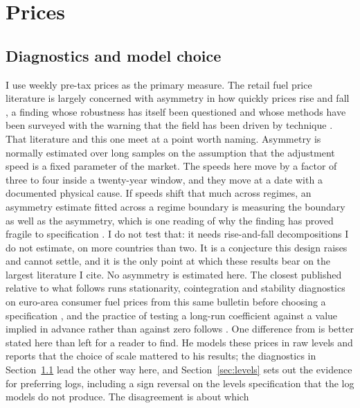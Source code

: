 \documentclass[11pt,a4paper]{article}
\begin{document}
\section{Prices}

\subsection{Diagnostics and model choice}
\label{sec:pricediag}

I use weekly pre-tax prices as the primary measure. The retail fuel price literature is largely
concerned with asymmetry in how quickly prices rise and fall \citep{bacon1991rockets,
borenstein1997gasoline, peltzman2000prices}, a finding whose robustness has itself been
questioned \citep{bachmeier2003new} and whose methods have been surveyed with the warning that
the field has been driven by technique \citep{meyer2004asymmetric}. That literature and this one
meet at a point worth naming. Asymmetry is normally estimated over long samples on the
assumption that the adjustment speed is a fixed parameter of the market. The speeds here move by
a factor of three to four inside a twenty-year window, and they move at a date with a documented
physical cause. If speeds shift that much across regimes, an asymmetry estimate fitted across a
regime boundary is measuring the boundary as well as the asymmetry, which is one reading of why
the finding has proved fragile to specification \citep{bachmeier2003new}. I do not test that: it
needs rise-and-fall decompositions I do not estimate, on more countries than two. It is a
conjecture this design raises and cannot settle, and it is the only point at which these results
bear on the largest literature I cite. No asymmetry is estimated here. The closest published
relative to what follows runs stationarity, cointegration and stability diagnostics on euro-area
consumer fuel prices from this same bulletin before choosing a specification
\citep{meyler2009passthrough}, and the practice of testing a long-run coefficient against a
value implied in advance rather than against zero follows \citet{bachmeier2006testing}. One
difference from \citet{meyler2009passthrough} is better stated here than left for a reader to
find. He models these prices in raw levels and reports that the choice of scale mattered to his
results; the diagnostics in Section~\ref{sec:pricediag} lead the other way here, and
Section~\ref{sec:levels} sets out the evidence for preferring logs, including a sign reversal on
the levels specification that the log models do not produce. The disagreement is about which
\end{document}
